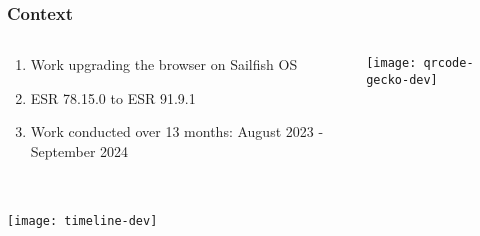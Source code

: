 \documentclass[
	notes=none,
	aspectratio=169
]{beamer}
\begin{document}

\begin{frame}
\frametitle{Context}

\begin{columns}[T]
\begin{column}[T]{0.7\textwidth}
\setlength{\parskip}{0.5em}

\vspace{2.0cm}
\begin{enumerate}
\setlength{\parskip}{0.5em}
\item Work upgrading the browser on Sailfish OS
\item ESR 78.15.0 to ESR 91.9.1
\item Work conducted over 13 months: August 2023 - September 2024
\end{enumerate}

\end{column}
\begin{column}[T]{0.3\textwidth}
\setlength{\parskip}{0.5em}

\vspace{0.5cm}


\vspace{0.5cm}
{\centering

\texttt{[image: qrcode-gecko-dev]}

\vspace{-0.1cm}



}

\end{column}
\end{columns}

\end{frame}
\note{
\begin{enumerate}
\item -
\end{enumerate}
}


\begin{frame}
\frametitle{}

\begin{columns}[T]
\begin{column}[T]{1.13\textwidth}

\vspace{0.0cm}
\texttt{[image: timeline-dev]}

\end{column}
\end{columns}

\end{frame}
\end{document}
